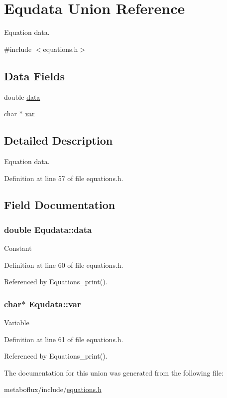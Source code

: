 \hypertarget{unionEqudata}{
\section{Equdata Union Reference}
\label{unionEqudata}
}


Equation data.  




{\ttfamily \#include $<$equations.h$>$}

\subsection*{Data Fields}
\begin{DoxyCompactItemize}
\item 
double \hyperlink{unionEqudata_ab4b5db8558e5e8a50215854b3e8a3756}{data}
\item 
char $\ast$ \hyperlink{unionEqudata_a48bbcfc2ff891a8bcd31f90591896985}{var}
\end{DoxyCompactItemize}


\subsection{Detailed Description}
Equation data. 

Definition at line 57 of file equations.h.



\subsection{Field Documentation}
\hypertarget{unionEqudata_ab4b5db8558e5e8a50215854b3e8a3756}{
\subsubsection[{data}]{\setlength{\rightskip}{0pt plus 5cm}double {\bf Equdata::data}}}
\label{unionEqudata_ab4b5db8558e5e8a50215854b3e8a3756}
Constant 

Definition at line 60 of file equations.h.



Referenced by Equations\_\-print().

\hypertarget{unionEqudata_a48bbcfc2ff891a8bcd31f90591896985}{
\subsubsection[{var}]{\setlength{\rightskip}{0pt plus 5cm}char$\ast$ {\bf Equdata::var}}}
\label{unionEqudata_a48bbcfc2ff891a8bcd31f90591896985}
Variable 

Definition at line 61 of file equations.h.



Referenced by Equations\_\-print().



The documentation for this union was generated from the following file:\begin{DoxyCompactItemize}
\item 
metaboflux/include/\hyperlink{equations_8h}{equations.h}\end{DoxyCompactItemize}
